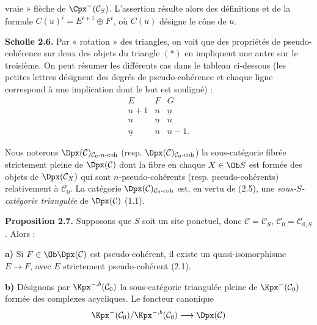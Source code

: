 vraie » flèche de \(\Cpx^-(\mathcal C_S)\). L'assertion résulte alors des définitions et de la formule \(C(u)^i=E^{i+1}\oplus F^i\), où \(C(u)\) désigne le cône de \(u\).

\textbf{Scholie 2.6.} Par « rotation » des triangles, on voit que des propriétés de pseudo-cohérence sur deux des objets du triangle \((*)\) en impliquent une autre sur le troisième. On peut résumer les différents cas dans le tableau ci-dessous (les petites lettres désignent des degrés de pseudo-cohérence et chaque ligne correspond à une implication dont le but est souligné) :
\[
\begin{array}{ccc}
E&F&G\\[0.2em]
n+1&n&\underline n\\
n&\underline n&n\\
\underline n&n&n-1 .
\end{array}
\]

Nous noterons \(\Dpx(\mathcal C)_{\mathcal C_0\text{-}n\text{-coh}}\) (resp. \(\Dpx(\mathcal C)_{\mathcal C_0\text{-}\mathrm{coh}}\)) la sous-catégorie fibrée strictement pleine de \(\Dpx(\mathcal C)\) dont la fibre en chaque \(X\in\Ob S\) est formée des objets de \(\Dpx(\mathcal C_X)\) qui sont \(n\)-pseudo-cohérents (resp. pseudo-cohérents) relativement à \(\mathcal C_0\). La catégorie \(\Dpx(\mathcal C)_{\mathcal C_0\text{-}\mathrm{coh}}\) est, en vertu de (2.5), une \emph{sous-\(S\)-catégorie triangulée} de \(\Dpx(\mathcal C)\) (1.1).

\textbf{Proposition 2.7.} Supposons que \(S\) soit un site ponctuel, donc \(\mathcal C=\mathcal C_S\), \(\mathcal C_0=\mathcal C_{0,S}\). Alors :

\textbf{a)} Si \(F\in\Ob\Dpx(\mathcal C)\) est pseudo-cohérent, il existe un quasi-isomorphisme \(E\longrightarrow F\), avec \(E\) strictement pseudo-cohérent (2.1).

\textbf{b)} Désignons par \(\Kpx^{-,b}(\mathcal C_0)\) la sous-catégorie triangulée pleine de \(\Kpx^-(\mathcal C_0)\) formée des complexes acycliques. Le foncteur canonique
\[
  \Kpx^-(\mathcal C_0)/\Kpx^{-,b}(\mathcal C_0)
  \longrightarrow \Dpx(\mathcal C)
\]
